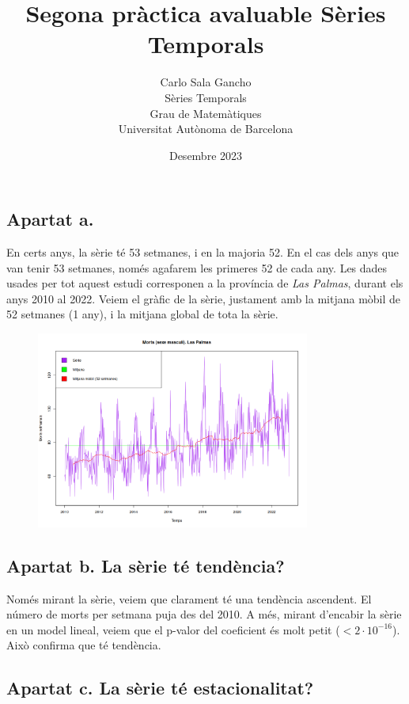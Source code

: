 \documentclass[a4paper, 11pt]{article}
\title{Segona pràctica avaluable Sèries Temporals}
\author{
  Carlo Sala Gancho\\
  Sèries Temporals\\
  Grau de Matemàtiques\\
  Universitat Autònoma de Barcelona } \date{Desembre 2023}
\begin{document}
\frenchspacing

\pagestyle{fancy}
\fancyhf{}
\fancyfoot[C]{\thepage}

\maketitle

\subsection*{Apartat a.}

En certs anys, la sèrie té 53 setmanes, i en la majoria 52. En el cas dels anys que van tenir 53 setmanes, només
agafarem les primeres 52 de cada any. Les dades usades per tot aquest estudi corresponen a la província de \textit{Las
  Palmas}, durant els anys 2010 al 2022. Veiem el gràfic de la sèrie, justament amb la mitjana mòbil de 52 setmanes (1
any), i la mitjana global de tota la sèrie.

\begin{figure}[H]
  \centering
  \includegraphics[width=9cm]{assets/serie.png}
\end{figure}

\subsection*{Apartat b. La sèrie té tendència?}

Només mirant la sèrie, veiem que clarament té una tendència ascendent. El número de morts per setmana puja des del
2010. A més, mirant d'encabir la sèrie en un model lineal, veiem que el p-valor del coeficient és molt petit ($< 2
  \cdot 10^{-16}$). Això confirma que té tendència.

\subsection*{Apartat c. La sèrie té estacionalitat?}
\end{document}
